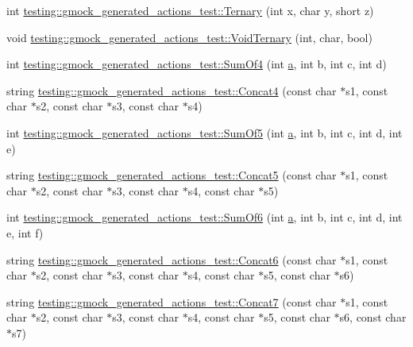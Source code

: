 \begin{DoxyCompactItemize}
\item 
int \hyperlink{namespacetesting_1_1gmock__generated__actions__test_a1b234626e33284c4159ea666d240d5ed}{testing\+::gmock\+\_\+generated\+\_\+actions\+\_\+test\+::\+Ternary} (int x, char y, short z)
\item 
void \hyperlink{namespacetesting_1_1gmock__generated__actions__test_a7b1b519421c70b90ea3c818d4cf565ac}{testing\+::gmock\+\_\+generated\+\_\+actions\+\_\+test\+::\+Void\+Ternary} (int, char, bool)
\item 
int \hyperlink{namespacetesting_1_1gmock__generated__actions__test_a2a5879c060adacf27c3528260172a7be}{testing\+::gmock\+\_\+generated\+\_\+actions\+\_\+test\+::\+Sum\+Of4} (int \hyperlink{_07copy_08_2_read_camera_model_8m_a551a3d351eadcc0b9b1a2f24f0fb5ea0}{a}, int b, int c, int d)
\item 
string \hyperlink{namespacetesting_1_1gmock__generated__actions__test_a18260e53a4612dc68eaa3b43a13ad57e}{testing\+::gmock\+\_\+generated\+\_\+actions\+\_\+test\+::\+Concat4} (const char $\ast$s1, const char $\ast$s2, const char $\ast$s3, const char $\ast$s4)
\item 
int \hyperlink{namespacetesting_1_1gmock__generated__actions__test_a7ebfbfdf11d92d4f99df6b659c371e74}{testing\+::gmock\+\_\+generated\+\_\+actions\+\_\+test\+::\+Sum\+Of5} (int \hyperlink{_07copy_08_2_read_camera_model_8m_a551a3d351eadcc0b9b1a2f24f0fb5ea0}{a}, int b, int c, int d, int e)
\item 
string \hyperlink{namespacetesting_1_1gmock__generated__actions__test_ac9d254c06f94974ffb0acd8d0f1f8d88}{testing\+::gmock\+\_\+generated\+\_\+actions\+\_\+test\+::\+Concat5} (const char $\ast$s1, const char $\ast$s2, const char $\ast$s3, const char $\ast$s4, const char $\ast$s5)
\item 
int \hyperlink{namespacetesting_1_1gmock__generated__actions__test_a3f60acee43510c1603549a1f3bab61ad}{testing\+::gmock\+\_\+generated\+\_\+actions\+\_\+test\+::\+Sum\+Of6} (int \hyperlink{_07copy_08_2_read_camera_model_8m_a551a3d351eadcc0b9b1a2f24f0fb5ea0}{a}, int b, int c, int d, int e, int f)
\item 
string \hyperlink{namespacetesting_1_1gmock__generated__actions__test_a0d9c60ff363796e3edec3587ce7fc856}{testing\+::gmock\+\_\+generated\+\_\+actions\+\_\+test\+::\+Concat6} (const char $\ast$s1, const char $\ast$s2, const char $\ast$s3, const char $\ast$s4, const char $\ast$s5, const char $\ast$s6)
\item 
string \hyperlink{namespacetesting_1_1gmock__generated__actions__test_ac53c9939d35ebbb093b795161fc42504}{testing\+::gmock\+\_\+generated\+\_\+actions\+\_\+test\+::\+Concat7} (const char $\ast$s1, const char $\ast$s2, const char $\ast$s3, const char $\ast$s4, const char $\ast$s5, const char $\ast$s6, const char $\ast$s7)

\end{DoxyCompactItemize}
